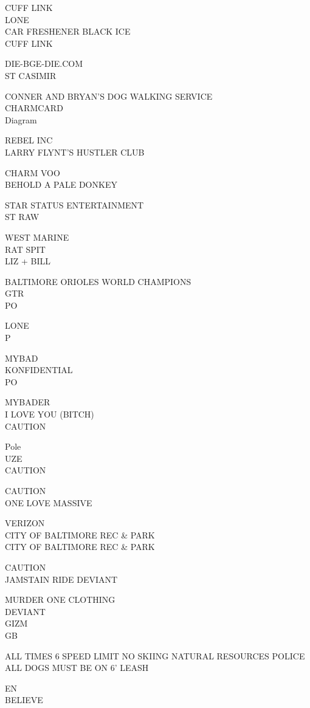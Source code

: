 \documentclass[10pt,letterpaper]{article}
\begin{document}
CUFF LINK\\
LONE\\
CAR FRESHENER BLACK ICE\\
CUFF LINK

DIE{-}BGE{-}DIE.COM\\
ST CASIMIR

CONNER AND BRYAN'S DOG WALKING SERVICE\\
CHARMCARD\\
Diagram

REBEL INC\\
LARRY FLYNT'S HUSTLER CLUB

CHARM VOO\\
BEHOLD A PALE DONKEY

STAR STATUS ENTERTAINMENT\\
ST RAW

WEST MARINE\\
RAT SPIT\\
LIZ + BILL

BALTIMORE ORIOLES WORLD CHAMPIONS\\
GTR\\
PO

LONE\\
P

MYBAD\\
KONFIDENTIAL\\
PO

MYBADER\\
I LOVE YOU (BITCH)\\
CAUTION

Pole\\
UZE\\
CAUTION

CAUTION\\
ONE LOVE MASSIVE

VERIZON\\
CITY OF BALTIMORE REC \& PARK\\
CITY OF BALTIMORE REC \& PARK

CAUTION\\
JAMSTAIN RIDE DEVIANT

MURDER ONE CLOTHING\\
DEVIANT\\
GIZM\\
GB

ALL TIMES 6 SPEED LIMIT NO SKIING NATURAL RESOURCES POLICE\\
ALL DOGS MUST BE ON 6' LEASH

EN\\
BELIEVE
\end{document}
